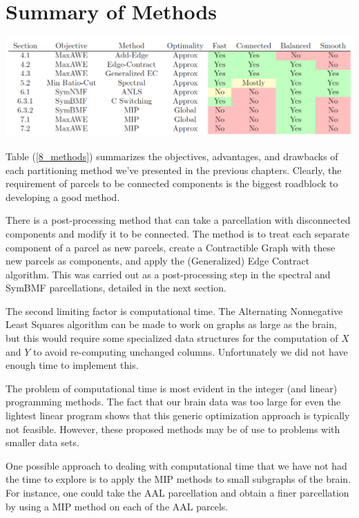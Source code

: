 \section{Summary of Methods}

\begin{table}
\caption{Summary of Partitioning Methods}
\label{8_methods}
\includegraphics[scale = 0.5]{figs/8_methods.png}
%
\end{table}

Table (\ref{8_methods}) summarizes the objectives, advantages, and
drawbacks of each partitioning method we've presented in the previous
chapters. Clearly, the requirement of parcels to be connected components
is the biggest roadblock to developing a good method.

There is a post-processing method that can take a parcellation with
disconnected components and modify it to be connected. The method is to
treat each separate component of a parcel as new parcels, create a
Contractible Graph with these new parcels as components, and apply the
(Generalized) Edge Contract algorithm. This was carried out as a
post-processing step in the spectral and SymBMF parcellations, detailed
in the next section.

The second limiting factor is computational time. The Alternating
Nonnegative Least Squares algorithm can be made to work on graphs as
large as the brain, but this would require some specialized data
structures for the computation of $X$ and $Y$ to avoid re-computing
unchanged columns. Unfortunately we did not have enough time to
implement this.

The problem of computational time is most evident in the integer (and
linear) programming methods. The fact that our brain data was too large
for even the lightest linear program shows that this generic
optimization approach is typically not feasible. However, these
proposed methods may be of use to problems with smaller data sets.

One possible approach to dealing with computational time that we have
not had the time to explore is to apply the MIP methods to small
subgraphs of the brain. For instance, one could take the AAL
parcellation and obtain a finer parcellation by using a MIP method on
each of the AAL parcels.

